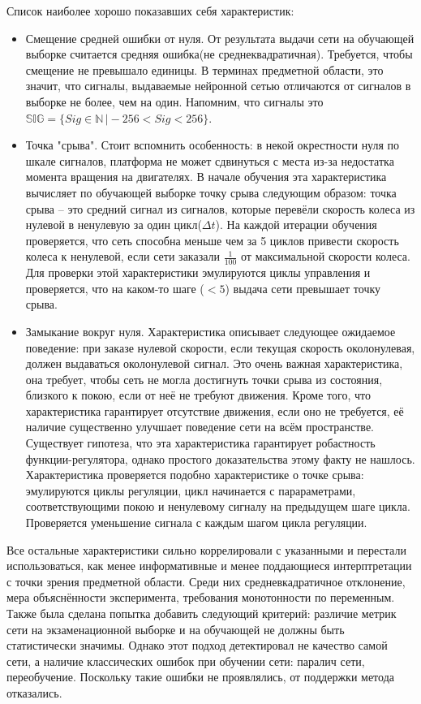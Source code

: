 \documentclass[14pt]{extreport}
\begin{document}
                Список наиболее хорошо показавших себя характеристик:
                    \begin{itemize}
                      \item Смещение средней ошибки от нуля. От результата выдачи сети на обучающей выборке считается средняя ошибка(не среднеквадратичная). Требуется, чтобы смещение не превышало единицы. В терминах предметной области, это значит, что сигналы, выдаваемые нейронной сетью отличаются от сигналов в выборке не более, чем на один. Напомним, что сигналы это $\mathbb{SIG} = \{Sig \in \mathbb{N}\,\vert -256 < Sig < 256\}$.
                      \item Точка "срыва". Стоит вспомнить особенность: в некой окрестности нуля по шкале сигналов, платформа не может сдвинуться с места из-за недостатка момента вращения на двигателях. В начале обучения эта характеристика вычисляет по обучающей выборке точку срыва следующим образом: точка срыва -- это средний сигнал из сигналов, которые перевёли скорость колеса из нулевой в ненулевую за один цикл(\(\Delta t\)). На каждой итерации обучения проверяется, что сеть способна меньше чем за 5 циклов привести скорость колеса к ненулевой, если сети заказали $\frac{1}{100}$ от максимальной скорости колеса. Для проверки этой характеристики эмулируются циклы управления и проверяется, что на каком-то шаге ($<5$) выдача сети превышает точку срыва.
                      \item Замыкание вокруг нуля. Характеристика описывает следующее ожидаемое поведение: при заказе нулевой скорости, если текущая скорость околонулевая, должен выдаваться околонулевой сигнал. Это очень важная характеристика, она требует, чтобы сеть не могла достигнуть точки срыва из состояния, близкого к покою, если от неё не требуют движения. Кроме того, что характеристика гарантирует отсутствие движения, если оно не требуется, её наличие существенно улучшает поведение сети на всём пространстве. Существует гипотеза, что эта характеристика гарантирует робастность функции-регулятора, однако простого доказательства этому факту не нашлось. Характеристика проверяется подобно характеристике о точке срыва: эмулируются циклы регуляции, цикл начинается с парараметрами, соответствующими покою и ненулевому сигналу на предыдущем шаге цикла. Проверяется уменьшение сигнала с каждым шагом цикла регуляции.
                    \end{itemize}
                Все остальные характеристики сильно коррелировали с указанными и перестали использоваться, как менее информативные и менее поддающиеся интерптретации с точки зрения предметной области. Среди них средневкадратичное отклонение, мера объяснённости эксперимента, требования монотонности по переменным.
                Также была сделана попытка добавить следующий критерий: различие метрик сети на экзаменационной выборке и на обучающей не должны быть статистически значимы. Однако этот подход детектировал не качество самой сети, а наличие классических ошибок при обучении сети: паралич сети, переобучение. Поскольку такие ошибки не проявлялись, от поддержки метода отказались.
\end{document}
